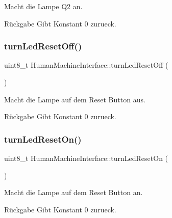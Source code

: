 Macht die Lampe Q2 an.

\begin{DoxyReturn}{Rückgabe}
Gibt Konstant 0 zurueck. 
\end{DoxyReturn}
\hypertarget{class_human_machine_interface_a446ad469f8c9f2717d12cc69ea68598f}{}\label{class_human_machine_interface_a446ad469f8c9f2717d12cc69ea68598f} 
\subsubsection{\texorpdfstring{turn\+Led\+Reset\+Off()}{turnLedResetOff()}}
{\footnotesize\ttfamily uint8\+\_\+t Human\+Machine\+Interface\+::turn\+Led\+Reset\+Off (\begin{DoxyParamCaption}{ }\end{DoxyParamCaption})}

Macht die Lampe auf dem Reset Button aus.

\begin{DoxyReturn}{Rückgabe}
Gibt Konstant 0 zurueck. 
\end{DoxyReturn}
\hypertarget{class_human_machine_interface_aecc34d7d1e3edbe2ed38e3808da65455}{}\label{class_human_machine_interface_aecc34d7d1e3edbe2ed38e3808da65455} 
\subsubsection{\texorpdfstring{turn\+Led\+Reset\+On()}{turnLedResetOn()}}
{\footnotesize\ttfamily uint8\+\_\+t Human\+Machine\+Interface\+::turn\+Led\+Reset\+On (\begin{DoxyParamCaption}{ }\end{DoxyParamCaption})}

Macht die Lampe auf dem Reset Button an.

\begin{DoxyReturn}{Rückgabe}
Gibt Konstant 0 zurueck. 
\end{DoxyReturn}
\hypertarget{class_human_machine_interface_a235557e9ae72f14a4db72bab675eaae1}{}\label{class_human_machine_interface_a235557e9ae72f14a4db72bab675eaae1} 
